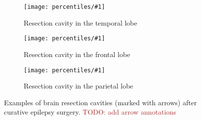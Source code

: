 \newcommand{\plotcavities}[2]{
  \begin{subfigure}{0.8\linewidth}
    \texttt{[image: percentiles/\#1]}
    \caption{#2}
  \end{subfigure}
}

\begin{figure}
  \centering

  \plotcavities{p_050_0185_without}{Resection cavity in the temporal lobe}
  \plotcavities{p_075_1263_without}{Resection cavity in the frontal lobe}
  \plotcavities{p_025_0039_without}{Resection cavity in the parietal lobe}

  \caption[Examples of brain resection cavities after curative epilepsy surgery.]{
    Examples of brain resection cavities (marked with arrows) after curative epilepsy surgery.
    \textcolor{brown}{TODO: add arrow annotations}
  }
  \label{fig:cavities}
\end{figure}
